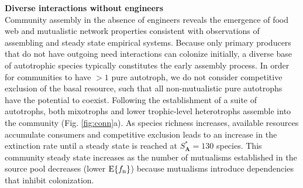 \documentclass[9pt,twocolumn,twoside]{pnas-new}
\newcommand{\rr}[1]{{\rm #1}}
\begin{document}







\noindent \textbf{Diverse interactions without engineers} \\
\noindent Community assembly in the absence of engineers reveals the emergence of food web and mutualistic network properties consistent with observations of assembling and steady state empirical systems.
Because only primary producers that do not have outgoing need interactions can colonize initially, a diverse base of autotrophic species typically constitutes the early assembly process.
In order for communities to have $>1$ pure autotroph, we do not consider competitive exclusion of the basal resource, such that all non-mutualistic pure autotrophs have the potential to coexist.
Following the establishment of a suite of autotrophs, both mixotrophs and lower trophic-level heterotrophs assemble into the community (Fig. \ref{fig:conn}a).
As species richness increases, available resources accumulate consumers and competitive exclusion leads to an increase in the extinction rate until a steady state is reached at $S^*_{\bm A}=130$ species.
This community steady state increases as the number of mutualisms established in the source pool decreases (lower $\rr{E}\{f_\rr{n}\}$) because mutualisms introduce dependencies that inhibit colonization.
\end{document}
